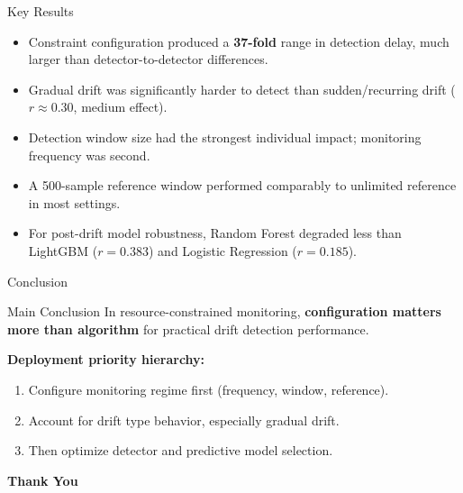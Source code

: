 \documentclass[aspectratio=169]{beamer}
\begin{document}
\begin{frame}{Key Results}
  \begin{itemize}
    \item Constraint configuration produced a \textbf{37-fold} range in detection delay, much larger than detector-to-detector differences.
    \item Gradual drift was significantly harder to detect than sudden/recurring drift (\(r \approx 0.30\), medium effect).
    \item Detection window size had the strongest individual impact; monitoring frequency was second.
    \item A 500-sample reference window performed comparably to unlimited reference in most settings.
    \item For post-drift model robustness, Random Forest degraded less than LightGBM (\(r=0.383\)) and Logistic Regression (\(r=0.185\)).
  \end{itemize}
\end{frame}

\begin{frame}{Conclusion}
  \begin{block}{Main Conclusion}
    In resource-constrained monitoring, \textbf{configuration matters more than algorithm} for practical drift detection performance.
  \end{block}

  \textbf{Deployment priority hierarchy:}
  \begin{enumerate}
    \item Configure monitoring regime first (frequency, window, reference).
    \item Account for drift type behavior, especially gradual drift.
    \item Then optimize detector and predictive model selection.
  \end{enumerate}

  \vspace{0.5em}
  \centering
  \large \textbf{Thank You}
\end{frame}
\end{document}
